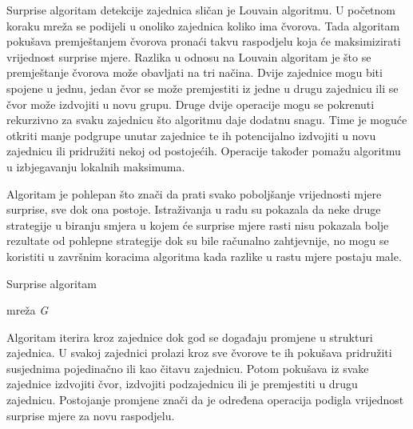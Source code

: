 \documentclass[times, utf8, diplomski]{fer}
\begin{document}
Surprise algoritam detekcije zajednica sličan je Louvain algoritmu. U početnom koraku mreža se podijeli u onoliko zajednica koliko ima čvorova. Tada algoritam pokušava premještanjem čvorova pronaći takvu raspodjelu koja će maksimizirati vrijednost surprise mjere. Razlika u odnosu na Louvain algoritam je što se premještanje čvorova može obavljati na tri načina. Dvije zajednice mogu biti spojene u jednu, jedan čvor se može premjestiti iz jedne u drugu zajednicu ili se čvor može izdvojiti u novu grupu. Druge dvije operacije mogu se pokrenuti rekurzivno za svaku zajednicu što algoritmu daje dodatnu snagu. Time je moguće otkriti manje podgrupe unutar zajednice te ih potencijalno izdvojiti u novu zajednicu ili pridružiti nekoj od postojećih. Operacije također pomažu algoritmu u izbjegavanju lokalnih maksimuma.

Algoritam je pohlepan što znači da prati svako poboljšanje vrijednosti mjere surprise, sve dok ona postoje. Istraživanja u radu \cite{gamermann2022algorithm} su pokazala da neke druge strategije u biranju smjera u kojem će surprise mjere rasti nisu pokazala bolje rezultate od pohlepne strategije dok su bile računalno zahtjevnije, no mogu se koristiti u završnim koracima algoritma kada razlike u rastu mjere postaju male.


\begin{algorithm}
	\caption{Surprise algoritam}
	\begin{algorithmic}[1]
		\REQUIRE mreža \textit{G}
		\ENDIF
		\ENDFOR
		\ENDFOR 
		\ENDWHILE
		\ENDWHILE
		\ENDFOR
		\ENDWHILE				
		\ENDFOR
		\ENDWHILE
	\end{algorithmic}
\end{algorithm}

Algoritam iterira kroz zajednice dok god se događaju promjene u strukturi zajednica. U svakoj zajednici prolazi kroz sve čvorove te ih pokušava pridružiti susjednima pojedinačno ili kao čitavu zajednicu. Potom pokušava iz svake zajednice izdvojiti čvor, izdvojiti podzajednicu ili je premjestiti u drugu zajednicu. Postojanje promjene znači da je određena operacija podigla vrijednost surprise mjere za novu raspodjelu.
\end{document}
